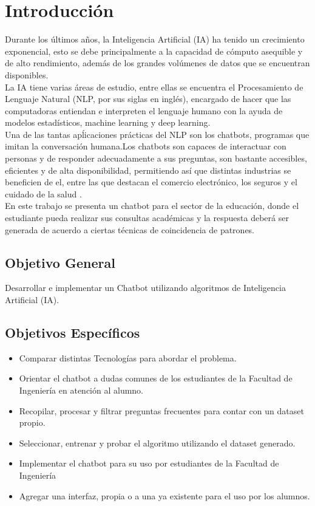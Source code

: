 \chapter[Introducción]{Introducción}
Durante los últimos años, la Inteligencia Artificial (IA) ha tenido un crecimiento exponencial,
esto se debe principalmente a la capacidad de cómputo asequible y de alto rendimiento, además de
los grandes volúmenes de datos que se encuentran disponibles.\cite{Oracle}\\
\indent La IA tiene varias áreas de estudio, entre ellas se encuentra el Procesamiento de Lenguaje
Natural (NLP, por sus siglas en inglés), encargado de hacer que las computadoras entiendan e
interpreten el lenguaje humano con la ayuda de modelos estadísticos, machine learning y deep
learning.\\
\indent Una de las tantas apĺicaciones prácticas del NLP son los chatbots, programas que imitan la
conversación humana.Los chatbots son capaces de interactuar con personas y de responder
adecuadamente a sus preguntas, son bastante accesibles, eficientes y de alta disponibilidad,
permitiendo así que distintas industrias se beneficien de el, entre las que destacan el comercio
electrónico, los seguros y el cuidado de la salud .\cite{building_chat-bots-with-python}\\
\indent En este trabajo se presenta un chatbot para el sector de la educación, donde el estudiante
pueda realizar sus consultas académicas y la respuesta deberá ser generada de acuerdo a ciertas
técnicas de coincidencia de patrones.

\section{Objetivo General}
Desarrollar e implementar un Chatbot utilizando algoritmos de Inteligencia Artificial (IA).

\section{Objetivos Específicos}
\begin{itemize}
	\item Comparar distintas Tecnologías para abordar el problema.
	\item Orientar el chatbot a dudas comunes de los estudiantes de la Facultad de Ingeniería en
	      atención al alumno.
	\item Recopilar, procesar y filtrar preguntas frecuentes para contar con un dataset propio.
	\item Seleccionar, entrenar y probar el algoritmo utilizando el dataset generado.
	\item Implementar el chatbot para su uso por estudiantes de la Facultad de Ingeniería
	\item	Agregar una interfaz, propia o a una ya existente para el uso por los alumnos.
\end{itemize}

